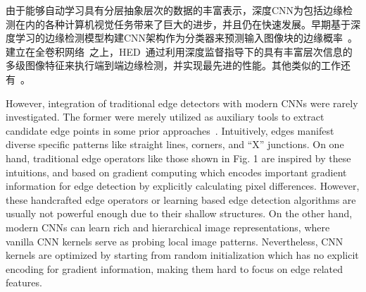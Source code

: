 \documentclass[10pt,twocolumn,letterpaper]{article}
\begin{document}
由于能够自动学习具有分层抽象层次的数据的丰富表示，深度CNN为包括边缘检测在内的各种计算机视觉任务带来了巨大的进步，并且仍在快速发展。早期基于深度学习的边缘检测模型构建CNN架构作为分类器来预测输入图像块的边缘概率~\cite{bertasius2015deepedge, shen2015deepcontour, bertasius2015hfl}。建立在全卷积网络~\cite{long2015fully}之上，HED~\cite{xie2017holistically}通过利用深度监督指导下的具有丰富层次信息的多级图像特征来执行端到端边缘检测，并实现最先进的性能。其他类似的工作还有~\cite{yang2016cedn, kokkinos2015deepboundary, maninis2016cob, wang2017ced, xu2018amhnet, liu2019richer, deng2018lpcb, he2019bidirectional}。

However, integration of traditional edge detectors with modern CNNs were rarely investigated. The former were merely utilized as auxiliary tools to extract candidate edge points in some prior approaches~\cite{bertasius2015hfl,bertasius2015deepedge}. Intuitively, edges manifest diverse specific patterns like straight lines, corners, and ``X'' junctions. On one hand, traditional edge operators like those shown in Fig. 1 are inspired by these intuitions, and based on gradient computing which encodes important gradient information for edge detection by explicitly calculating pixel differences. However, these handcrafted edge operators or learning based edge detection algorithms are usually not powerful enough due to their shallow structures. On the other hand, modern CNNs can learn rich and hierarchical image representations, where vanilla CNN kernels serve as probing local image patterns. Nevertheless, CNN kernels are optimized by starting from random initialization which has no explicit encoding for gradient information, making them hard to focus on edge related features.
\end{document}
